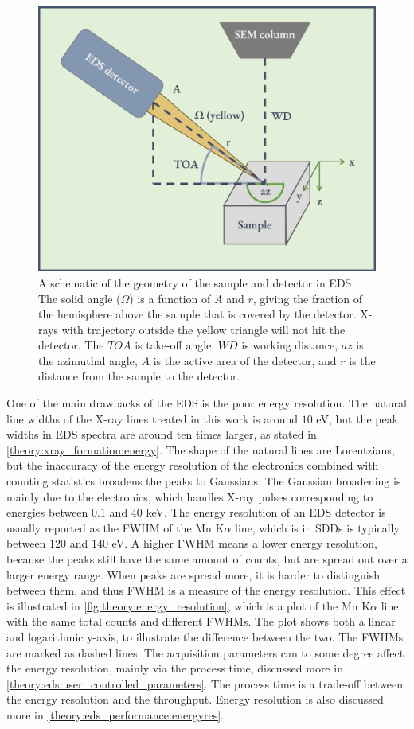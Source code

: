\begin{figure}[ht]
    \centering
    \includegraphics[width=0.6\linewidth]{figures/EDS_geometry.png}
    \caption{
        A schematic of the geometry of the sample and detector in EDS.
        The solid angle ($\Omega$) is a function of $A$ and $r$, giving the fraction of the hemisphere above the sample that is covered by the detector.
        X-rays with trajectory outside the yellow triangle will not hit the detector.
        The $TOA$ is take-off angle, $WD$ is working distance, $az$ is the azimuthal angle, $A$ is the active area of the detector, and $r$ is the distance from the sample to the detector.
    }
    \label{fig:eds_geometry}
\end{figure}






One of the main drawbacks of the EDS is the poor energy resolution. %
The natural line widths of the X-ray lines treated in this work is around $10$ eV, but the peak widths in EDS spectra are around ten times larger, as stated in \cref{theory:xray_formation:energy}.
The shape of the natural lines are Lorentzians, but the inaccuracy of the energy resolution of the electronics combined with counting statistics broadens the peaks to Gaussians.
The Gaussian broadening is mainly due to the electronics, which handles X-ray pulses corresponding to energies between $0.1$ and $40$ keV.
The energy resolution of an EDS detector is usually reported as the FWHM of the Mn K$\alpha$ line, which is in SDDs is typically between $120$ and $140$ eV.
A higher FWHM means a lower energy resolution, because the peaks still have the same amount of counts, but are spread out over a larger energy range.
When peaks are spread more, it is harder to distinguish between them, and thus FWHM is a measure of the energy resolution.
This effect is illustrated in \cref{fig:theory:energy_resolution}, which is a plot of the Mn K$\alpha$ line with the same total counts and different FWHMs.
The plot shows both a linear and logarithmic y-axis, to illustrate the difference between the two.
The FWHMs are marked as dashed lines.
The acquisition parameters can to some degree affect the energy resolution, mainly via the process time, discussed more in \cref{theory:eds:user_controlled_parameters}.
The process time is a trade-off between the energy resolution and the throughput.
Energy resolution is also discussed more in \cref{theory:eds_performance:energyres}.



